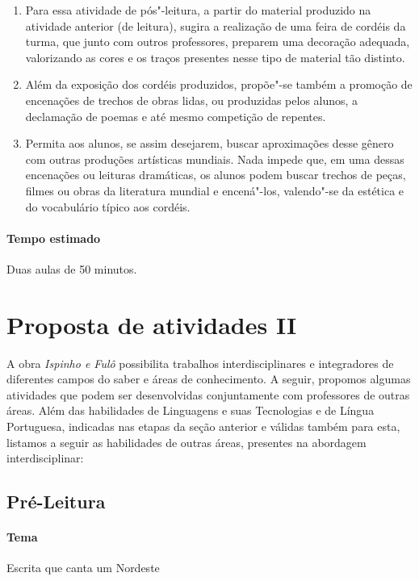 \documentclass[12pt]{extarticle}
\begin{document}
\begin{enumerate}
\item
Para essa atividade de pós"-leitura, a partir do material produzido na atividade anterior (de leitura), 
sugira a realização de uma feira de cordéis da turma, que junto com outros professores, 
preparem uma decoração adequada, valorizando as cores e os traços presentes nesse tipo de material tão
distinto. 

\item
Além da exposição dos cordéis produzidos, propõe"-se também a
promoção de encenações de trechos de obras lidas, ou produzidas pelos
alunos, a declamação de poemas e até mesmo competição de repentes. 

\item
Permita aos alunos, se assim desejarem, buscar aproximações desse gênero 
com outras produções artísticas mundiais. Nada impede que, em uma dessas encenações 
ou leituras dramáticas, os alunos podem buscar trechos de peças, filmes ou obras da
literatura mundial e encená"-los, valendo"-se da estética e do vocabulário
típico aos cordéis.

\end{enumerate}

\paragraph{Tempo estimado} Duas aulas de 50 minutos. 

\section{Proposta de atividades II}
A obra \emph{Ispinho e Fulô} possibilita trabalhos interdisciplinares e
integradores de diferentes campos do saber e áreas de conhecimento. A
seguir, propomos algumas atividades que podem ser desenvolvidas
conjuntamente com professores de outras áreas. Além das habilidades de
Linguagens e suas Tecnologias e de Língua Portuguesa, indicadas nas
etapas da seção anterior e válidas também para esta, listamos a seguir
as habilidades de outras áreas, presentes na abordagem interdisciplinar:


\subsection{Pré-Leitura}

\paragraph{Tema} Escrita que canta um Nordeste 
\end{document}
